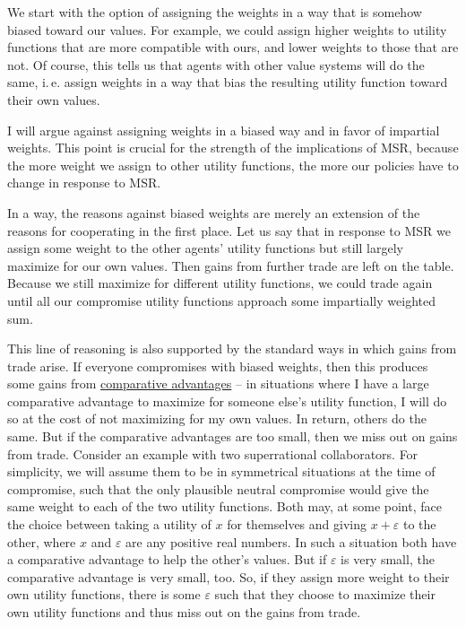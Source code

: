 We start with the option of assigning the weights in a way that is
somehow biased toward our values. For example, we could assign higher
weights to utility functions that are more compatible with ours, and
lower weights to those that are not. Of course, this tells us that
agents with other value systems will do the same, i.\,e. assign weights in
a way that bias the resulting utility function toward their own values.

I will argue against assigning weights in a biased way and in favor of
impartial weights. This point is crucial for the strength of the
implications of MSR, because the more weight we assign to other utility
functions, the more our policies have to change in response to MSR.

In a way, the reasons against biased weights are merely an extension of
the reasons for cooperating in the first place. Let us say that in
response to MSR we assign some weight to the other agents' utility
functions but still largely maximize for our own values. Then gains from
further trade are left on the table. Because we still maximize for
different utility functions, we could trade again until all our
compromise utility functions approach some impartially weighted sum.

This line of reasoning is also supported by the standard ways in which
gains from trade arise. If everyone compromises with biased weights,
then this produces some gains from
\href{https://en.wikipedia.org/wiki/Comparative_advantage}{comparative
advantages} -- in situations where I have a large comparative advantage
to maximize for someone else's utility function, I will do so at the
cost of not maximizing for my own values. In return, others do the same.
But if the comparative advantages are too small, then we miss out on
gains from trade. Consider an example with two superrational
collaborators. For simplicity, we will assume them to be in symmetrical
situations at the time of compromise, such that the only plausible
neutral compromise would give the same weight to each of the two utility
functions. Both may, at some point, face the choice between taking a
utility of \(x\) for themselves and giving \(x + \varepsilon\) to the
other, where \(x\) and \(\varepsilon\) are any positive real numbers. In
such a situation both have a comparative advantage to help the other's
values. But if \(\varepsilon\) is very small, the comparative advantage
is very small, too. So, if they assign more weight to their own utility
functions, there is some \(\varepsilon\) such that they choose to
maximize their own utility functions and thus miss out on the gains from
trade.

